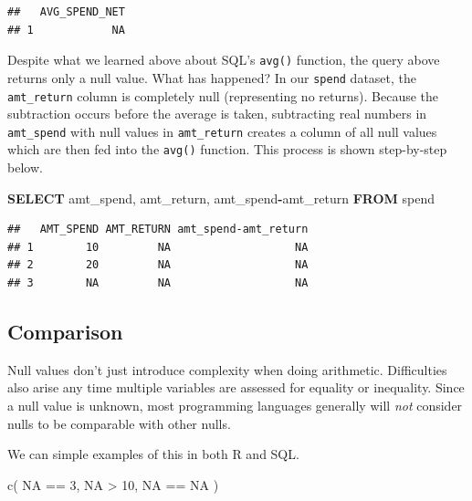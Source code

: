 \documentclass[
]{krantz}
\makeatletter
\newenvironment{Shaded}{\begin{snugshade}}{\end{snugshade}}
\newcommand{\ConstantTok}[1]{\textcolor[rgb]{0,0,0}{#1}}
\newcommand{\DecValTok}[1]{\textcolor[rgb]{0.06,0.06,0.06}{#1}}
\newcommand{\FunctionTok}[1]{\textcolor[rgb]{0,0,0}{#1}}
\newcommand{\KeywordTok}[1]{\textcolor[rgb]{0.27,0.27,0.27}{\textbf{#1}}}
\newcommand{\NormalTok}[1]{#1}
\newcommand{\OperatorTok}[1]{\textcolor[rgb]{0.43,0.43,0.43}{\textbf{#1}}}
\newcommand{\SpecialCharTok}[1]{\textcolor[rgb]{0,0,0}{#1}}
\newenvironment{kframe}{%
\medskip{}
\setlength{\fboxsep}{.8em}
 \def\at@end@of@kframe{}%
 \ifinner\ifhmode%
  \def\at@end@of@kframe{\end{minipage}}%
  \begin{minipage}{\columnwidth}%
 \fi\fi%
 \def\FrameCommand##1{\hskip\@totalleftmargin \hskip-\fboxsep
 \colorbox{shadecolor}{##1}\hskip-\fboxsep
     \hskip-\linewidth \hskip-\@totalleftmargin \hskip\columnwidth}%
 \MakeFramed {\advance\hsize-\width
   \@totalleftmargin\z@ \linewidth\hsize
   \@setminipage}}%
 {\par\unskip\endMakeFramed%
 \at@end@of@kframe}
\renewenvironment{Shaded}{\begin{kframe}}{\end{kframe}}
\makeatother
\begin{document}
\begin{verbatim}
##   AVG_SPEND_NET
## 1            NA
\end{verbatim}

Despite what we learned above about SQL's \texttt{avg()} function, the query above returns only a null value.
What has happened?
In our \texttt{spend} dataset, the \texttt{amt\_return} column is completely null (representing no returns).
Because the subtraction occurs before the average is taken, subtracting real numbers in \texttt{amt\_spend} with null values in \texttt{amt\_return} creates a column of all null values which are then fed into the \texttt{avg()} function.
This process is shown step-by-step below.

\begin{Shaded}
\begin{Highlighting}[]
\KeywordTok{SELECT}
\NormalTok{  amt\_spend, }
\NormalTok{  amt\_return, }
\NormalTok{  amt\_spend}\OperatorTok{{-}}\NormalTok{amt\_return }
\KeywordTok{FROM}\NormalTok{ spend}
\end{Highlighting}
\end{Shaded}

\begin{verbatim}
##   AMT_SPEND AMT_RETURN amt_spend-amt_return
## 1        10         NA                   NA
## 2        20         NA                   NA
## 3        NA         NA                   NA
\end{verbatim}

\hypertarget{comparison}{%
\subsection{Comparison}\label{comparison}}

Null values don't just introduce complexity when doing arithmetic. Difficulties also arise any time multiple variables are assessed for equality or inequality. Since a null value is unknown, most programming languages generally will \emph{not} consider nulls to be comparable with other nulls.

We can simple examples of this in both R and SQL.

\begin{Shaded}
\begin{Highlighting}[]
\FunctionTok{c}\NormalTok{(}
  \ConstantTok{NA} \SpecialCharTok{==} \DecValTok{3}\NormalTok{, }
  \ConstantTok{NA} \SpecialCharTok{\textgreater{}} \DecValTok{10}\NormalTok{, }
  \ConstantTok{NA} \SpecialCharTok{==} \ConstantTok{NA}
\NormalTok{  )}
\end{Highlighting}
\end{Shaded}
\end{document}

